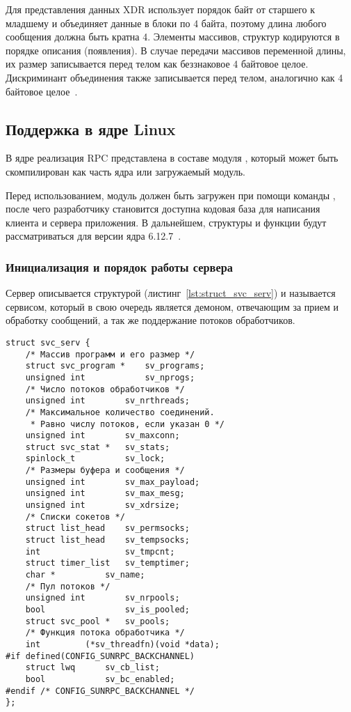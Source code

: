 Для представления данных XDR использует порядок байт от старшего к младшему и
объединяет данные в блоки по 4 байта, поэтому длина любого сообщения должна
быть кратна 4. Элементы массивов, структур кодируются в порядке описания
(появления). В случае передачи массивов переменной длины, их размер
записывается перед телом как беззнаковое 4 байтовое целое. Дискриминант
объединения также записывается перед телом, аналогично как 4 байтовое
целое~\cite{rfc4506}.

\subsection{Поддержка в ядре Linux}

В ядре реализация RPC представлена в составе модуля , который
может быть скомпилирован как часть ядра или загружаемый модуль.

Перед использованием, модуль должен быть загружен при помощи команды
, после чего разработчику становится доступна кодовая
база для написания клиента и сервера приложения. В дальнейшем, структуры и
функции будут рассматриваться для версии ядра 6.12.7~\cite{LinuxKernel6127}.

\subsubsection{Инициализация и порядок работы сервера}

Сервер описывается структурой 
(листинг~\ref{lst:struct_svc_serv}) и называется сервисом, который в свою
очередь является демоном, отвечающим за прием и обработку сообщений, а так же
поддержание потоков обработчиков.

\begin{lstlisting}[caption={Структура сервиса}, label={lst:struct_svc_serv}]
struct svc_serv {
    /* Массив программ и его размер */
    struct svc_program *    sv_programs;
    unsigned int            sv_nprogs;
    /* Число потоков обработчиков */
    unsigned int        sv_nrthreads;
    /* Максимальное количество соединений.
     * Равно числу потоков, если указан 0 */
    unsigned int        sv_maxconn;
    struct svc_stat *   sv_stats;
    spinlock_t          sv_lock;
    /* Размеры буфера и сообщения */
    unsigned int        sv_max_payload;
    unsigned int        sv_max_mesg;
    unsigned int        sv_xdrsize;
    /* Списки сокетов */
    struct list_head    sv_permsocks;
    struct list_head    sv_tempsocks;
    int                 sv_tmpcnt;
    struct timer_list   sv_temptimer;
    char *          sv_name;
    /* Пул потоков */
    unsigned int        sv_nrpools;
    bool                sv_is_pooled;
    struct svc_pool *   sv_pools;
    /* Функция потока обработчика */
    int         (*sv_threadfn)(void *data);
#if defined(CONFIG_SUNRPC_BACKCHANNEL)
    struct lwq      sv_cb_list;
    bool            sv_bc_enabled;
#endif /* CONFIG_SUNRPC_BACKCHANNEL */
};
\end{lstlisting}

